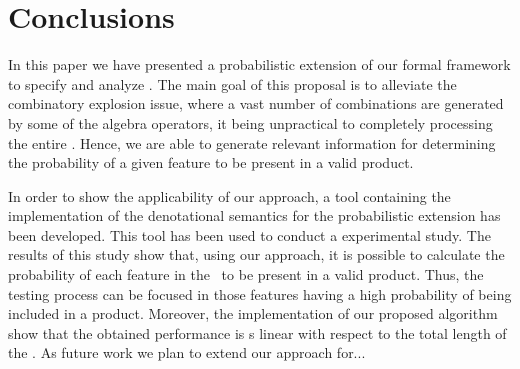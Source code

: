 \section{Conclusions}
\label{section:jstat:concs}

In this paper we have presented a probabilistic extension of our 
formal framework to specify and analyze \SPLs. The main goal of this 
proposal is to alleviate the combinatory explosion issue, where a vast
number of combinations are generated by some of the algebra operators,
it being unpractical to completely processing the entire \SPL. Hence, we
are able to generate relevant information for determining the probability 
of a given feature to be present in a valid product.

In order to show the applicability of our approach, a tool containing the 
implementation of the denotational semantics for the probabilistic extension
has been developed. This tool has been used to conduct a experimental study.
%
The results of this study show that, using our approach, it is possible to calculate 
the probability of each feature in the \SPL\ to be present in a valid product. 
Thus, the testing process can be focused in those features having a high probability 
of being included in a product. Moreover, the implementation of our proposed algorithm
show that the obtained performance is s linear with respect to the total length of the \SPL.
%
%
%
%
As future work we plan to extend our approach for...

